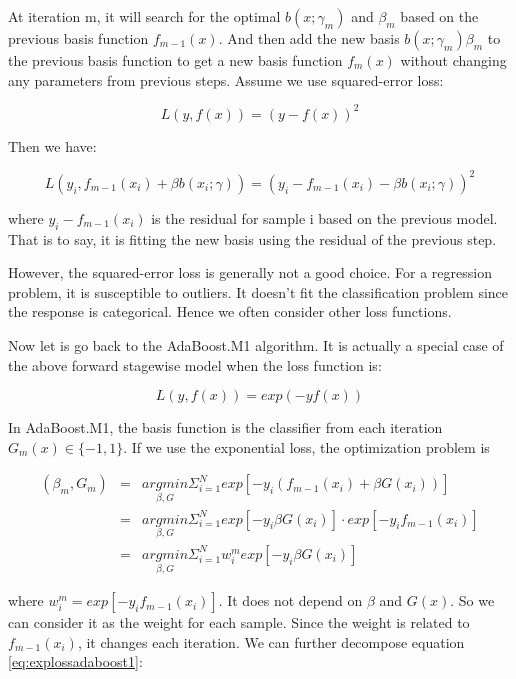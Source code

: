 \documentclass[12pt,]{krantz}
\begin{document}
At iteration m, it will search for the optimal \(b(x;\gamma_m)\) and \(\beta_m\) based on the previous basis function \(f_{m-1}(x)\). And then add the new basis \(b(x;\gamma_m)\beta_m\) to the previous basis function to get a new basis function \(f_m(x)\) without changing any parameters from previous steps. Assume we use squared-error loss:

\[L(y,f(x))=(y-f(x))^2\]

Then we have:

\[L(y_i,f_{m-1}(x_i)+\beta b(x_i;\gamma))=(y_i-f_{m-1}(x_i)-\beta b(x_i;\gamma))^2\]

where \(y_i-f_{m-1}(x_i)\) is the residual for sample i based on the previous model. That is to say, it is fitting the new basis using the residual of the previous step.

However, the squared-error loss is generally not a good choice. For a regression problem, it is susceptible to outliers. It doesn't fit the classification problem since the response is categorical. Hence we often consider other loss functions.

Now let is go back to the AdaBoost.M1 algorithm. It is actually a special case of the above forward stagewise model when the loss function is:

\[L(y,f(x))=exp(-yf(x))\]

In AdaBoost.M1, the basis function is the classifier from each iteration \(G_m(x)\in \{-1,1\}\). If we use the exponential loss, the optimization problem is

\begin{equation}
\begin{array}{ccc}
(\beta_m,G_m) & = & \underset{\beta,G}{argmin}\Sigma_{i=1}^N exp[-y_i(f_{m-1}(x_i)+\beta G(x_i))]\\
& = & \underset{\beta, G}{argmin}\Sigma_{i=1}^N exp[-y_i \beta G(x_i)]\cdot exp[-y_if_{m-1}(x_i)]\\
& = & \underset{\beta, G}{argmin}\Sigma_{i=1}^N w_i^m exp[-y_i\beta G(x_i)]
\end{array}
\label{eq:explossadaboost1}
\end{equation}

where \(w_i^m= exp[-y_if_{m-1}(x_i)]\). It does not depend on \(\beta\) and \(G(x)\). So we can consider it as the weight for each sample. Since the weight is related to \(f_{m-1}(x_i)\), it changes each iteration. We can further decompose equation \eqref{eq:explossadaboost1}:
\end{document}
